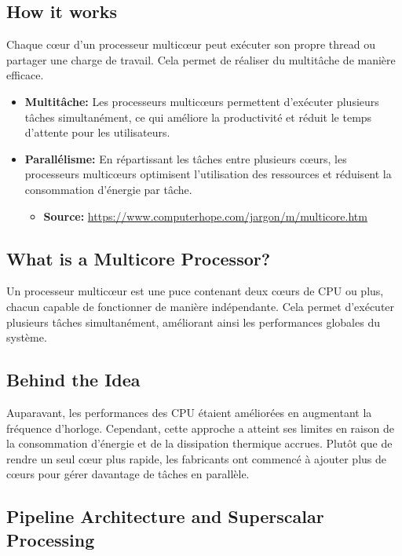 \documentclass[10pt,a4paper]{article}
\begin{document}
\subsection*{How it works}

Chaque cœur d'un processeur multicœur peut exécuter son propre thread ou partager une charge de travail. Cela permet de réaliser du multitâche de manière efficace.

\begin{itemize}
    \item \textbf{Multitâche:} Les processeurs multicœurs permettent d'exécuter plusieurs tâches simultanément, ce qui améliore la productivité et réduit le temps d'attente pour les utilisateurs.
    \item \textbf{Parallélisme:} En répartissant les tâches entre plusieurs cœurs, les processeurs multicœurs optimisent l'utilisation des ressources et réduisent la consommation d'énergie par tâche.
    \begin{itemize}
        \item \textbf{Source:} \url{https://www.computerhope.com/jargon/m/multicore.htm}
    \end{itemize}
\end{itemize}

\subsection*{What is a Multicore Processor?}

Un processeur multicœur est une puce contenant deux cœurs de CPU ou plus, chacun capable de fonctionner de manière indépendante. Cela permet d'exécuter plusieurs tâches simultanément, améliorant ainsi les performances globales du système.

\subsection*{Behind the Idea}

Auparavant, les performances des CPU étaient améliorées en augmentant la fréquence d'horloge. Cependant, cette approche a atteint ses limites en raison de la consommation d'énergie et de la dissipation thermique accrues. Plutôt que de rendre un seul cœur plus rapide, les fabricants ont commencé à ajouter plus de cœurs pour gérer davantage de tâches en parallèle.

\subsection*{Pipeline Architecture and Superscalar Processing}
\end{document}
